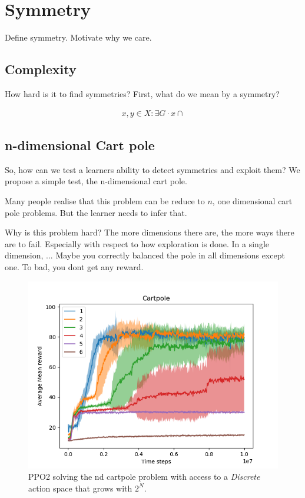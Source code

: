\section{Symmetry}

Define symmetry. Motivate why we care.


\subsection{Complexity}

How hard is it to find symmetries?
First, what do we mean by a symmetry?

\begin{align}
x, y \in X : \exists G \cdot x \cap
\end{align}



\subsection{n-dimensional Cart pole}

So, how can we test a learners ability to detect symmetries and exploit them?
We propose a simple test, the n-dimensional cart pole.

Many people realise that this problem can be reduce to $n$, one dimensional cart pole problems.
But the learner needs to infer that.

\cite{Brockman2016,baselines}

Why is this problem hard? The more dimensions there are, the more ways there are to fail.
Especially with respect to how exploration is done. In a single dimension, ...
Maybe you correctly balanced the pole in all dimensions except one. To bad, you dont get any reward.

\begin{figure}
\centering
\includegraphics[width=1\textwidth,height=0.5\textheight]{../../pictures/figures/discrete-nd-cart.png}
\caption{PPO2 solving the nd cartpole problem with access to a \textit{Discrete} action space that grows with $2^N$.}
\end{figure}



